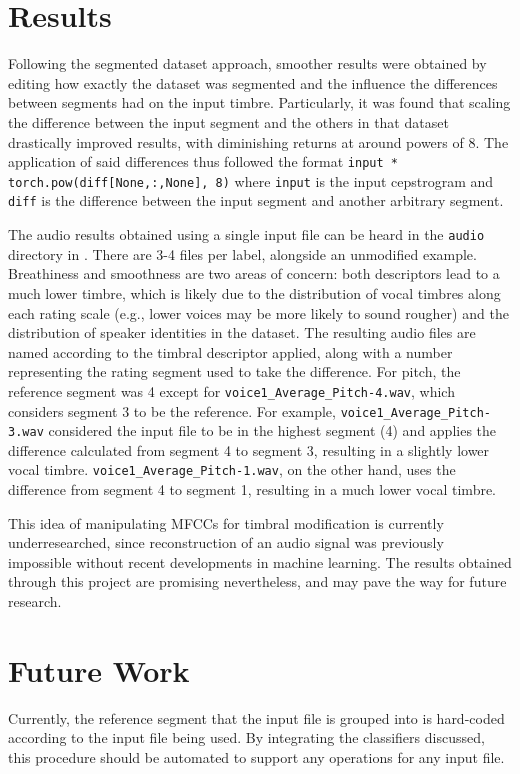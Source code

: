 \documentclass{article}
\begin{document}
\section{Results}\label{sec:page_size}

Following the segmented dataset approach, smoother results were obtained by editing how exactly the dataset was segmented and the influence the differences between segments had on the input timbre. Particularly, it was found that scaling the difference between the input segment and the others in that dataset drastically improved results, with diminishing returns at around powers of 8. The application of said differences thus followed the format \texttt{input * torch.pow(diff[None,:,None], 8)} where \texttt{input} is the input cepstrogram and \texttt{diff} is the difference between the input segment and another arbitrary segment.

The audio results obtained using a single input file can be heard in the \texttt{audio} directory in \cite{github}. There are 3-4 files per label, alongside an unmodified example. Breathiness and smoothness are two areas of concern: both descriptors lead to a much lower timbre, which is likely due to the distribution of vocal timbres along each rating scale (e.g., lower voices may be more likely to sound rougher) and the distribution of speaker identities in the dataset. The resulting audio files are named according to the timbral descriptor applied, along with a number representing the rating segment used to take the difference. For pitch, the reference segment was 4 except for \texttt{voice1\_Average\_Pitch-4.wav}, which considers segment 3 to be the reference. For example, \texttt{voice1\_Average\_Pitch-3.wav} considered the input file to be in the highest segment (4) and applies the difference calculated from segment 4 to segment 3, resulting in a slightly lower vocal timbre. \texttt{voice1\_Average\_Pitch-1.wav}, on the other hand, uses the difference from segment 4 to segment 1, resulting in a much lower vocal timbre.

This idea of manipulating MFCCs for timbral modification is currently underresearched, since reconstruction of an audio signal was previously impossible without recent developments in machine learning. The results obtained through this project are promising nevertheless, and may pave the way for future research.


\section{Future Work}\label{sec:page_size}
Currently, the reference segment that the input file is grouped into is hard-coded according to the input file being used. By integrating the classifiers discussed, this procedure should be automated to support any operations for any input file.
\end{document}
